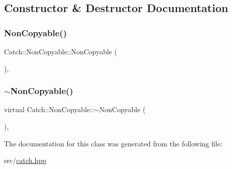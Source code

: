 \subsection{Constructor \& Destructor Documentation}
\mbox{\label{class_catch_1_1_non_copyable_a4b492dd5753f9952350fb64dc6cb9fe2}} 
\subsubsection{\texorpdfstring{Non\+Copyable()}{NonCopyable()}}
{\footnotesize\ttfamily Catch\+::\+Non\+Copyable\+::\+Non\+Copyable (\begin{DoxyParamCaption}{ }\end{DoxyParamCaption})\hspace{0.3cm}{\ttfamily [inline]}, {\ttfamily [protected]}}

\mbox{\label{class_catch_1_1_non_copyable_a81254677280fef337eb4a676e91e3293}} 
\subsubsection{\texorpdfstring{$\sim$\+Non\+Copyable()}{~NonCopyable()}}
{\footnotesize\ttfamily virtual Catch\+::\+Non\+Copyable\+::$\sim$\+Non\+Copyable (\begin{DoxyParamCaption}{ }\end{DoxyParamCaption})\hspace{0.3cm}{\ttfamily [protected]}, {\ttfamily [virtual]}}



The documentation for this class was generated from the following file\+:\begin{DoxyCompactItemize}
\item 
src/\hyperlink{catch_8hpp}{catch.\+hpp}\end{DoxyCompactItemize}
